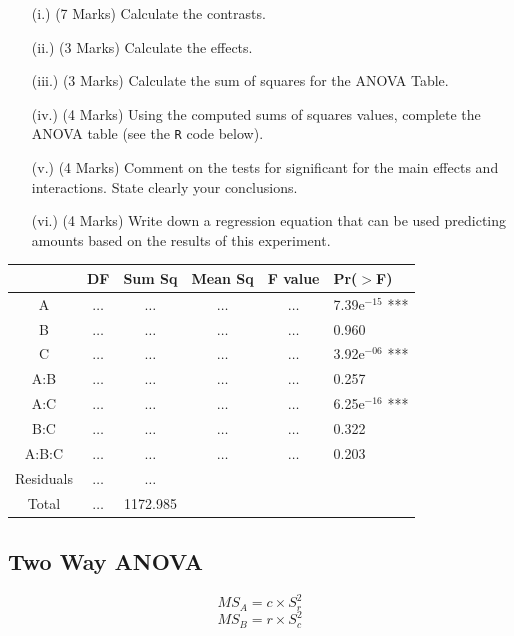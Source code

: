 \documentclass[a4paper,12pt]{article}
\begin{document}
\begin{itemize}
	\item[(i.)] (7 Marks) Calculate the contrasts.
	\item[(ii.)] (3 Marks) Calculate the effects.
	\item[(iii.)] (3 Marks) Calculate the sum of squares for the ANOVA Table.
	\item[(iv.)] (4 Marks) Using the computed sums of squares values, complete the ANOVA table (see the \texttt{R} code below).
	\item[(v.)] (4 Marks) Comment on the tests for significant for the main effects and interactions. State clearly your conclusions.
	\item[(vi.)] (4 Marks) Write down a regression equation that can be used predicting amounts based on the results of this experiment.
\end{itemize}
\begin{center}
	\begin{tabular}{|c|c|c|c|c|l|}\hline
		& DF & Sum Sq & Mean Sq & F value&   Pr($>$F)\\  
		\hline A & $\ldots$ & $\ldots$ & $\ldots$  & $\ldots$ &  7.39e$^{-15}$ ***\\ 
		\hline B & $\ldots$ & $\ldots$ & $\ldots$  & $\ldots$ &  0.960  \\ 
		\hline C &\phantom{m} $\ldots$ \phantom{m}  & $\ldots$ & $\ldots$  & $\ldots$ & 3.92e$^{-06}$ *** \\ 
		\hline A:B & $\ldots$ & $\ldots$ & $\ldots$  & $\ldots$ & 0.257 \\ 
		\hline A:C & $\ldots$ & $\ldots$ & $\ldots$  & $\ldots$ & 6.25e$^{-16}$ *** \\ 
		\hline B:C & $\ldots$ & $\ldots$ & $\ldots$  & $\ldots$ & 0.322  \\                 
		\hline A:B:C & $\ldots$ & $\ldots$ & $\ldots$  & $\ldots$ & 0.203  \\ 
		\hline Residuals & $\ldots$ & $\ldots$ &  & &  \\ \hline
		\hline Total & $\ldots$ & 1172.985 &  & &  \\ 	
		\hline 
	\end{tabular} 
\end{center}

\large


\subsection*{Two Way ANOVA}
\[MS_A = c \times S^2_r\]
\[MS_B = r \times S^2_c\]
\end{document}
